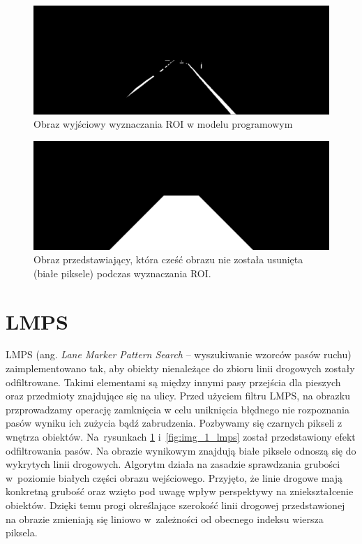 \begin{figure}[h]
	\centering
	\includegraphics[scale=0.3]{obraz_roi.png}
	\caption{Obraz wyjściowy wyznaczania ROI w modelu programowym}
	\label{fig:out_ROI}
\end{figure}
\begin{figure}[h]
	\centering
	\includegraphics[scale=0.3]{roi.png}
	\caption{Obraz przedstawiający, która cześć obrazu nie została usunięta (białe piksele) podczas wyznaczania ROI. }
	\label{fig:out_ROI_mask}
\end{figure}


\section{LMPS}
LMPS (ang. \textit{Lane Marker Pattern Search} -- wyszukiwanie wzorców pasów ruchu) zaimplementowano tak, aby obiekty nienależące do zbioru linii drogowych zostały odfiltrowane. 
Takimi elementami są między innymi pasy przejścia dla pieszych oraz przedmioty znajdujące się na ulicy. 
Przed użyciem filtru LMPS, na obrazku przprowadzamy operację zamknięcia w celu uniknięcia błędnego nie rozpoznania pasów wyniku ich zużycia bądź zabrudzenia. Pozbywamy się czarnych pikseli z wnętrza obiektów.
Na~rysunkach \ref{fig:out_ROI} i~\ref{fig:img_1_lmps} został przedstawiony efekt odfiltrowania pasów. 
Na obrazie wynikowym znajdują białe piksele odnoszą się do wykrytych linii drogowych. 
Algorytm działa na zasadzie sprawdzania grubości w~poziomie białych części obrazu wejściowego. 
Przyjęto, że linie drogowe mają konkretną grubość oraz wzięto pod uwagę wpływ perspektywy na zniekształcenie obiektów. 
Dzięki temu progi określające szerokość linii drogowej przedstawionej na obrazie zmieniają się liniowo w~zależności od obecnego indeksu wiersza piksela.

